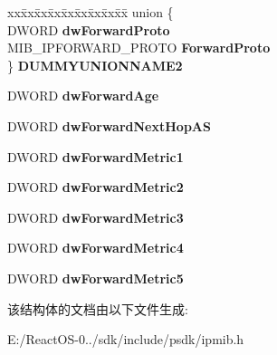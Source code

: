 \begin{DoxyCompactItemize}
\begin{tabbing}
\end{tabbing}\item 
\mbox{\label{struct___m_i_b___i_p_f_o_r_w_a_r_d_r_o_w_a875afe423b9c1f142d8f382ec8740d8f}} 
\begin{tabbing}
xx\=xx\=xx\=xx\=xx\=xx\=xx\=xx\=xx\=\kill
union \{\\
\>DWORD {\bfseries dwForwardProto}\\
\>MIB\_IPFORWARD\_PROTO {\bfseries ForwardProto}\\
\} {\bfseries DUMMYUNIONNAME2}\\

\end{tabbing}\item 
\mbox{\label{struct___m_i_b___i_p_f_o_r_w_a_r_d_r_o_w_ae217be35362afeb2d3b6bb21c868a322}} 
D\+W\+O\+RD {\bfseries dw\+Forward\+Age}
\item 
\mbox{\label{struct___m_i_b___i_p_f_o_r_w_a_r_d_r_o_w_ab816520e98fac1754730dddad40a5d00}} 
D\+W\+O\+RD {\bfseries dw\+Forward\+Next\+Hop\+AS}
\item 
\mbox{\label{struct___m_i_b___i_p_f_o_r_w_a_r_d_r_o_w_a73fb7204349e13c877db498e35e94ee5}} 
D\+W\+O\+RD {\bfseries dw\+Forward\+Metric1}
\item 
\mbox{\label{struct___m_i_b___i_p_f_o_r_w_a_r_d_r_o_w_a332f82aaae00086522668ae969ca5abd}} 
D\+W\+O\+RD {\bfseries dw\+Forward\+Metric2}
\item 
\mbox{\label{struct___m_i_b___i_p_f_o_r_w_a_r_d_r_o_w_a66521bdd22bb1111d8a0a385125ef387}} 
D\+W\+O\+RD {\bfseries dw\+Forward\+Metric3}
\item 
\mbox{\label{struct___m_i_b___i_p_f_o_r_w_a_r_d_r_o_w_ad91dc8f5a70c7bd1989078aa5a004d42}} 
D\+W\+O\+RD {\bfseries dw\+Forward\+Metric4}
\item 
\mbox{\label{struct___m_i_b___i_p_f_o_r_w_a_r_d_r_o_w_a1b91324e508972db0694fbdcaa9cc116}} 
D\+W\+O\+RD {\bfseries dw\+Forward\+Metric5}
\end{DoxyCompactItemize}


该结构体的文档由以下文件生成\+:\begin{DoxyCompactItemize}
\item 
E\+:/\+React\+O\+S-\/0../sdk/include/psdk/ipmib.\+h\end{DoxyCompactItemize}
